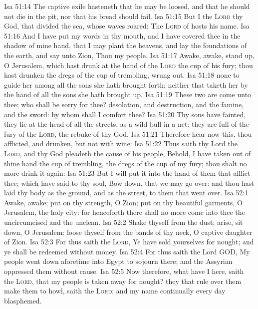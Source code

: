 \vs Isa 51:14 The captive exile hasteneth that he may be loosed, and that he should not die in the pit, nor that his bread should fail.
\vs Isa 51:15 But I  the \textsc{Lord} thy God, that divided the sea, whose waves roared: The \textsc{Lord} of hosts  his name.
\vs Isa 51:16 And I have put my words in thy mouth, and I have covered thee in the shadow of mine hand, that I may plant the heavens, and lay the foundations of the earth, and say unto Zion, Thou  my people.
\vs Isa 51:17 Awake, awake, stand up, O Jerusalem, which hast drunk at the hand of the \textsc{Lord} the cup of his fury; thou hast drunken the dregs of the cup of trembling,  wrung  out.
\vs Isa 51:18  none to guide her among all the sons  she hath brought forth; neither  that taketh her by the hand of all the sons  she hath brought up.
\vs Isa 51:19 These two  are come unto thee; who shall be sorry for thee? desolation, and destruction, and the famine, and the sword: by whom shall I comfort thee?
\vs Isa 51:20 Thy sons have fainted, they lie at the head of all the streets, as a wild bull in a net: they are full of the fury of the \textsc{Lord}, the rebuke of thy God.
\vs Isa 51:21 Therefore hear now this, thou afflicted, and drunken, but not with wine:
\vs Isa 51:22 Thus saith thy Lord the \textsc{Lord}, and thy God  pleadeth the cause of his people, Behold, I have taken out of thine hand the cup of trembling,  the dregs of the cup of my fury; thou shalt no more drink it again:
\vs Isa 51:23 But I will put it into the hand of them that afflict thee; which have said to thy soul, Bow down, that we may go over: and thou hast laid thy body as the ground, and as the street, to them that went over.
\vs Isa 52:1 Awake, awake; put on thy strength, O Zion; put on thy beautiful garments, O Jerusalem, the holy city: for henceforth there shall no more come into thee the uncircumcised and the unclean.
\vs Isa 52:2 Shake thyself from the dust; arise,  sit down, O Jerusalem: loose thyself from the bands of thy neck, O captive daughter of Zion.
\vs Isa 52:3 For thus saith the \textsc{Lord}, Ye have sold yourselves for nought; and ye shall be redeemed without money.
\vs Isa 52:4 For thus saith the Lord GOD, My people went down aforetime into Egypt to sojourn there; and the Assyrian oppressed them without cause.
\vs Isa 52:5 Now therefore, what have I here, saith the \textsc{Lord}, that my people is taken away for nought? they that rule over them make them to howl, saith the \textsc{Lord}; and my name continually every day  blasphemed.
